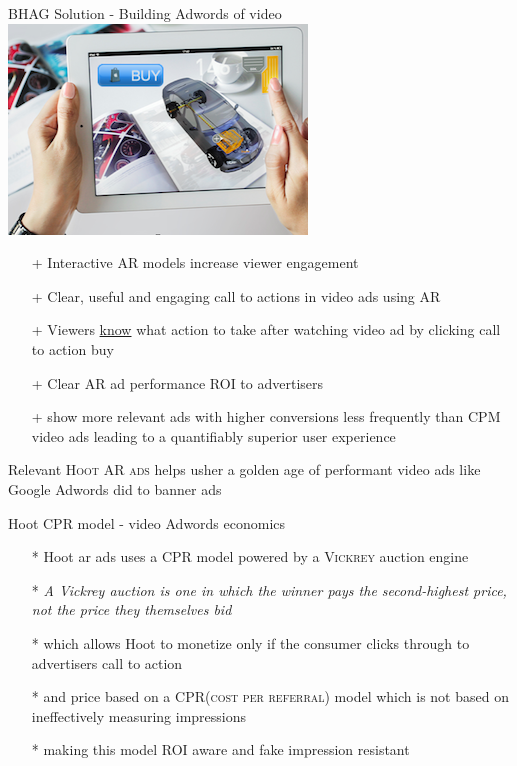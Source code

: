 \documentclass[11pt]{beamer}
\begin{document}
\begin{frame}[fragile]{BHAG Solution -  Building Adwords of video \includegraphics[scale=.1]{static/arad/arad5} }
\begin{itemize}[<+-| alert@+>]
\item[+]Interactive AR models increase viewer engagement
\item[+]Clear, useful and engaging call to actions in video ads using AR
\item[+]Viewers \underline{know} what action to take after watching video ad by clicking call to action buy 
\item[+]Clear AR ad performance \textsc{ROI} to advertisers 
\item[+]show more relevant ads with higher conversions less frequently than CPM video ads leading to a quantifiably superior user experience 
\end{itemize}
\pause
Relevant \textsc{Hoot AR ads} helps usher a golden age of performant video ads like Google Adwords did to banner ads


\end{frame}

\begin{frame}[t]{Hoot CPR model - video Adwords economics}
\begin{itemize}[<+-| alert@+>]
\item[*] Hoot ar ads uses a CPR model powered by a \textsc{Vickrey} auction engine
\item[*]\emph{A Vickrey auction is one in which the winner pays the second-highest price, not the price they themselves bid}
\item[*]which allows Hoot to monetize only if the consumer clicks through to advertisers call to action
\item[*]and price based on a \textsc{CPR(cost per referral)} model which is not based on ineffectively measuring impressions
\item[*]making this model ROI aware and fake impression resistant
\end{itemize}
\end{frame}
\end{document}
